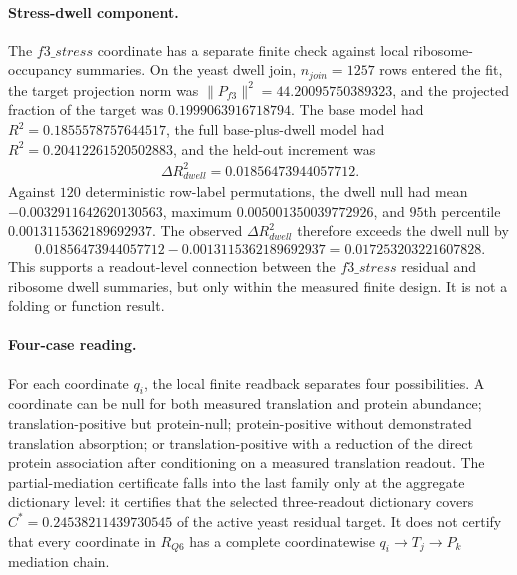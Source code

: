 \paragraph{Stress-dwell component.}
The $f3\_{stress}$ coordinate has a separate finite check against local ribosome-occupancy summaries.  On the yeast dwell join, $n_{join}=1257$ rows entered the fit, the target projection norm was $\lVert P_{f3}\rVert^2=44.20095750389323$, and the projected fraction of the target was $0.1999063916718794$.  The base model had $R^2=0.1855578757644517$, the full base-plus-dwell model had $R^2=0.20412261520502883$, and the held-out increment was
$$
\begin{aligned}
\Delta R^2_{dwell}=0.01856473944057712.
\end{aligned}
$$
Against $120$ deterministic row-label permutations, the dwell null had mean $-0.0032911642620130563$, maximum $0.005001350039772926$, and $95$th percentile $0.0013115362189692937$.  The observed $\Delta R^2_{dwell}$ therefore exceeds the dwell null by
$$
\begin{aligned}
0.01856473944057712-0.0013115362189692937=0.017253203221607828.
\end{aligned}
$$
This supports a readout-level connection between the $f3\_{stress}$ residual and ribosome dwell summaries, but only within the measured finite design.  It is not a folding or function result.

\paragraph{Four-case reading.}
For each coordinate $q_i$, the local finite readback separates four possibilities.  A coordinate can be null for both measured translation and protein abundance; translation-positive but protein-null; protein-positive without demonstrated translation absorption; or translation-positive with a reduction of the direct protein association after conditioning on a measured translation readout.  The partial-mediation certificate falls into the last family only at the aggregate dictionary level: it certifies that the selected three-readout dictionary covers $C^{\ast}=0.24538211439730545$ of the active yeast residual target.  It does not certify that every coordinate in $R_{Q6}$ has a complete coordinatewise $q_i\to T_j\to P_k$ mediation chain.

